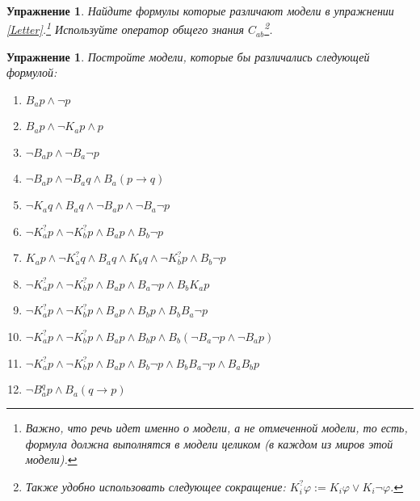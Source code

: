 \documentclass[11pt]{article}
\newtheorem{exercise}[theorem]{Упражнение}
\begin{document}
\begin{exercise} Найдите формулы которые различают модели в упражнении \ref{Letter}.\footnote{ Важно, что речь идет именно о модели, а не \textit{отмеченной} модели, то есть, формула должна выполнятся в модели целиком (в каждом из миров этой модели).} Используйте оператор общего знания $C_{ab}$\footnote{ Также удобно использовать следующее сокращение: $K^{?}_{i} \varphi:= K_i \varphi \vee K_i \neg \varphi$.}.
\end{exercise}

\begin{exercise} Постройте модели, которые бы различались следующей формулой:
\begin{enumerate}
	\item $B_a p \wedge \neg p$
	\item $B_a p \wedge \neg K_a p \wedge  p$
	\item $\neg B_a p \wedge \neg B_a \neg p$
	\item $\neg B_a p \wedge \neg B_a q \wedge B_a (p \to q)$
    \item $\neg K_a q \wedge B_a q \wedge \neg B_a p \wedge \neg B_a \neg p$
    \item $\neg K^{?}_a p \wedge \neg K^{?}_b p \wedge  B_a p \wedge B_b \neg p$
    \item $K_a p \wedge \neg K^{?}_a q \wedge B_a q \wedge K_b q \wedge \neg K^{?}_b p \wedge B_b \neg p  $
    \item $\neg K^{?}_a p \wedge \neg K^{?}_b p \wedge  B_a p \wedge B_a \neg p \wedge B_b K_a p$
	\item $\neg K^{?}_a p \wedge \neg K^{?}_b p \wedge B_a p \wedge B_b p  \wedge B_b B_a \neg p$ 
	\item $\neg K^{?}_a p \wedge \neg K^{?}_b p \wedge B_a p \wedge B_b p  \wedge B_b (\neg B_a \neg p \wedge \neg B_a p)$ 
	\item $\neg K^{?}_a p \wedge \neg K^{?}_b p \wedge B_a p \wedge B_b \neg p  \wedge B_b B_a \neg p \wedge B_a B_b p$ 
	\item $\neg B^{q}_{a} p \wedge  B_{a} (q \to p)$ 
\end{enumerate}	
\end{exercise}
\end{document}
